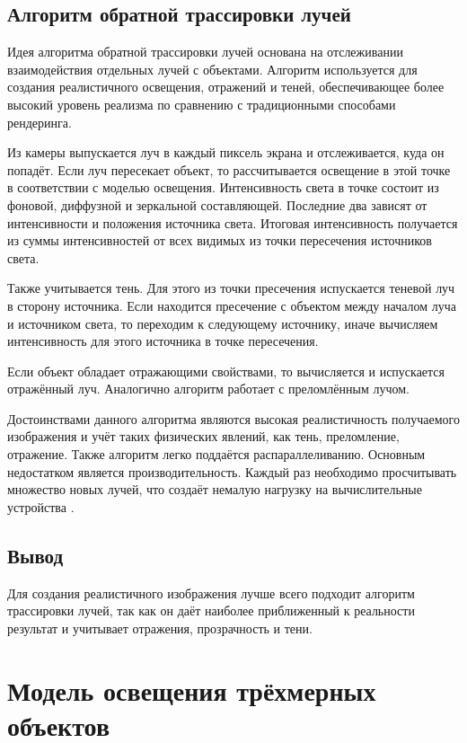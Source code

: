 \subsection{Алгоритм обратной трассировки лучей}

Идея алгоритма обратной трассировки лучей основана на отслеживании взаимодействия отдельных лучей с объектами. Алгоритм используется для создания реалистичного освещения, отражений и теней, обеспечивающее более высокий уровень реализма по сравнению с традиционными способами рендеринга.

Из камеры выпускается луч в каждый пиксель экрана и отслеживается, куда он попадёт. Если луч пересекает объект, то рассчитывается освещение в этой точке в соответствии с моделью освещения. Интенсивность света в точке состоит из фоновой, диффузной и зеркальной составляющей. Последние два зависят от интенсивности и положения источника света. Итоговая интенсивность получается из суммы интенсивностей от всех видимых из точки пересечения источников света.

Также учитывается тень. Для этого из точки пресечения испускается теневой луч в сторону источника. Если находится пресечение с объектом между началом луча и источником света, то переходим к следующему источнику, иначе вычисляем интенсивность для этого источника в точке пересечения.

Если объект обладает отражающими свойствами, то вычисляется и испускается отражённый луч. Аналогично алгоритм работает с преломлённым лучом. 

Достоинствами данного алгоритма являются высокая реалистичность получаемого изображения и учёт таких физических явлений, как тень, преломление, отражение. Также алгоритм легко поддаётся распараллеливанию. Основным недостатком является производительность. Каждый раз необходимо просчитывать множество новых лучей, что создаёт немалую нагрузку на вычислительные устройства \cite{alg}.

\subsection*{Вывод}

Для создания реалистичного изображения лучше всего подходит алгоритм трассировки лучей, так как он даёт наиболее приближенный к реальности результат и учитывает отражения, прозрачность и тени.

\section{Модель освещения трёхмерных объектов}

